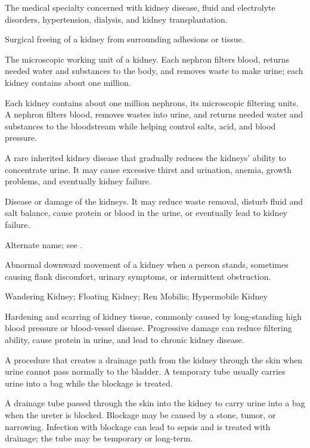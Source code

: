  The medical specialty concerned with kidney disease, fluid and electrolyte disorders, hypertension, dialysis, and kidney transplantation.

 Surgical freeing of a kidney from surrounding adhesions or tissue.

 The microscopic working unit of a kidney. Each nephron filters blood, returns needed water and substances to the body, and removes waste to make urine; each kidney contains about one million.

 Each kidney contains about one million nephrons, its microscopic filtering units. A nephron filters blood, removes wastes into urine, and returns needed water and substances to the bloodstream while helping control salts, acid, and blood pressure.

 A rare inherited kidney disease that gradually reduces the kidneys’ ability to concentrate urine. It may cause excessive thirst and urination, anemia, growth problems, and eventually kidney failure.

 Disease or damage of the kidneys. It may reduce waste removal, disturb fluid and salt balance, cause protein or blood in the urine, or eventually lead to kidney failure.

 Alternate name; see .

 Abnormal downward movement of a kidney when a person stands, sometimes causing flank discomfort, urinary symptoms, or intermittent obstruction.

\synonyms
Wandering Kidney; Floating Kidney; Ren Mobilis; Hypermobile Kidney

 Hardening and scarring of kidney tissue, commonly caused by long-standing high blood pressure or blood-vessel disease. Progressive damage can reduce filtering ability, cause protein in urine, and lead to chronic kidney disease.

 A procedure that creates a drainage path from the kidney through the skin when urine cannot pass normally to the bladder. A temporary tube usually carries urine into a bag while the blockage is treated.

 A drainage tube passed through the skin into the kidney to carry urine into a bag when the ureter is blocked. Blockage may be caused by a stone, tumor, or narrowing. Infection with blockage can lead to sepsis and is treated with drainage; the tube may be temporary or long-term.

